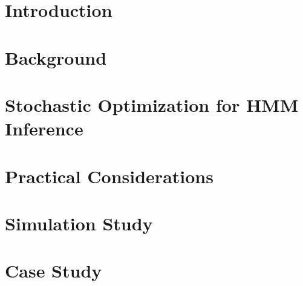 \documentclass{article}
\begin{document}
\begin{abstract}
\end{abstract}

\section{Introduction}


\section{Background}


\section{Stochastic Optimization for HMM Inference}


\section{Practical Considerations}

\label{sec:prac}

\section{Simulation Study}


\section{Case Study}

\end{document}
